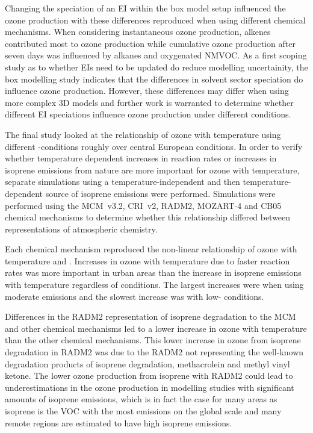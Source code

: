 Changing the speciation of an EI within the box model setup influenced the ozone production with these differences reproduced when using different chemical mechanisms.
When considering instantaneous ozone production, alkenes contributed most to ozone production while cumulative ozone production after seven days was influenced by alkanes and oxygenated NMVOC.
As a first scoping study as to whether EIs need to be updated do reduce modelling uncertainity, the box modelling study indicates that the differences in solvent sector speciation do influence ozone production.
However, these differences may differ when using more complex 3D models and further work is warranted to determine whether different EI speciations influence ozone production under different conditions.

The final study looked at the relationship of ozone with temperature using different -conditions roughly over central European conditions.
In order to verify whether temperature dependent increases in reaction rates or increases in isoprene emissions from nature are more important for ozone with temperature, separate simulations using a temperature-independent and then temperature-dependent source of isoprene emissions were performed.
Simulations were performed using the MCM~v3.2, CRI~v2, RADM2, MOZART-4 and CB05 chemical mechanisms to determine whether this relationship differed between representations of atmospheric chemistry.

Each chemical mechanism reproduced the non-linear relationship of ozone with temperature and .
Increases in ozone with temperature due to faster reaction rates was more important in urban areas than the increase in isoprene emissions with temperature regardless of  conditions.
The largest increases were when using moderate  emissions and the slowest increase was with low- conditions.

Differences in the RADM2 representation of isoprene degradation to the MCM and other chemical mechanisms led to a lower increase in ozone with temperature than the other chemical mechanisms.
This lower increase in ozone from isoprene degradation in RADM2 was due to the RADM2 not representing the well-known degradation products of isoprene degradation, methacrolein and methyl vinyl ketone.
The lower ozone production from isoprene with RADM2 could lead to underestimations in the ozone production in modelling studies with significant amounts of isoprene emissions, which is in fact the case for many areas as isoprene is the VOC with the most emissions on the global scale and many remote regions are estimated to have high isoprene emissions.

